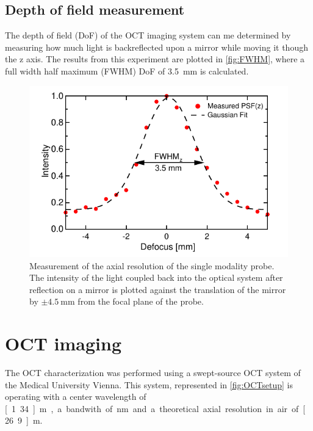\subsection{Depth of field measurement}
The depth of field (DoF) of the OCT imaging system can me determined by measuring how much light is backreflected upon a mirror while moving it though the z axis. The results from this experiment are plotted in \autoref{fig:FWHM}, where a full width half maximum (FWHM) DoF of \SI{3.5}{\milli\meter} is calculated. 

\begin{figure}[h!]\centering \includegraphics{figures/50_Measurements/conf/res/PSFz.pdf}
      \caption{Measurement of the axial resolution of the single modality probe. The intensity of the light coupled back into the optical system after reflection on a mirror is plotted against the translation of the mirror by $\pm \SI{4.5}{\milli\meter}$ from the focal plane of the probe. }
      \label{fig:FWHM}
\end{figure}




\clearpage
\section{OCT imaging}

The OCT characterization was performed using a swept-source OCT system of the Medical University Vienna. This system, represented in \autoref{fig:OCTsetup} is operating with a center wavelength of \unit[1.34]{\textmu m}, a bandwith of \unit[37]{nm} and a theoretical axial resolution in air of \unit[26.9]{\textmu m}.

